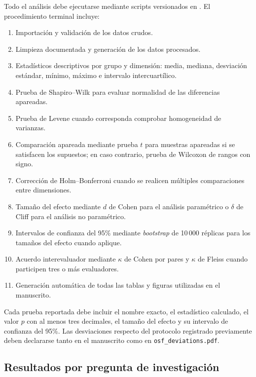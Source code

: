 \documentclass[12pt,journal,onecolumn]{IEEEtran}
\begin{document}
Todo el análisis debe ejecutarse mediante scripts versionados en
. El procedimiento terminal incluye:

\begin{enumerate}
    \item Importación y validación de los datos crudos.
    \item Limpieza documentada y generación de los datos procesados.
    \item Estadísticos descriptivos por grupo y dimensión: media, mediana,
          desviación estándar, mínimo, máximo e intervalo intercuartílico.
    \item Prueba de Shapiro--Wilk para evaluar normalidad de las diferencias
          apareadas.
    \item Prueba de Levene cuando corresponda comprobar homogeneidad de
          varianzas.
    \item Comparación apareada mediante prueba $t$ para muestras apareadas si
          se satisfacen los supuestos; en caso contrario, prueba de Wilcoxon
          de rangos con signo.
    \item Corrección de Holm--Bonferroni cuando se realicen múltiples
          comparaciones entre dimensiones.
    \item Tamaño del efecto mediante $d$ de Cohen para el análisis paramétrico
          o $\delta$ de Cliff para el análisis no paramétrico.
    \item Intervalos de confianza del 95\% mediante \emph{bootstrap} de
          10\,000 réplicas para los tamaños del efecto cuando aplique.
    \item Acuerdo interevaluador mediante $\kappa$ de Cohen por pares y
          $\kappa$ de Fleiss cuando participen tres o más evaluadores.
    \item Generación automática de todas las tablas y figuras utilizadas en
          el manuscrito.
\end{enumerate}

Cada prueba reportada debe incluir el nombre exacto, el estadístico calculado,
el valor $p$ con al menos tres decimales, el tamaño del efecto y su intervalo
de confianza del 95\%. Las desviaciones respecto del protocolo registrado
previamente deben declararse tanto en el manuscrito como en
\texttt{osf\_deviations.pdf}.

\subsection{Resultados por pregunta de investigación}
\end{document}
